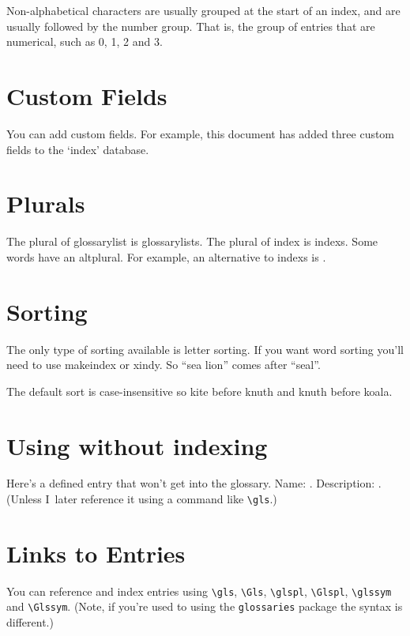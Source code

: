 \documentclass{book}
\newcommand*{\glsaltpl}[1]{\useentry{#1}{AltPlural}}
\begin{document}
Non-alphabetical characters are usually grouped at the start of an
index, and are usually followed by the number group. That is, the
group of entries that are numerical, such as \gls{0}, \gls{1},
\gls{2} and \gls{3}.

\section{Custom Fields}

You can add custom fields. For example, this document has added
three custom fields to the `index' database.

\section{Plurals}

The \gls{plural} of \gls{glossarylist} is
\glspl{glossarylist}. The \gls{plural} of \gls{index} is
\glspl{index}. Some words have an \gls{altplural}. For example,
an alternative to \glspl{index} is 
\glsaltpl{index}.%

\section{Sorting}

The only type of sorting available is letter sorting. If you want
word sorting you'll need to use \gls{makeindex} or \gls{xindy}.
So ``\gls{sea lion}'' comes after ``\gls{seal}''.

The default sort is case-insensitive so \gls{kite} before
\gls{knuth} and \gls{knuth} before \gls{koala}.

\section{Using without indexing}

Here's a defined entry that won't get into the glossary.
Name: .
Description: .
(Unless I~later reference it using a command like \verb|\gls|.)

\section{Links to Entries}

You can reference and index entries using \verb|\gls|, \verb|\Gls|,
\verb|\glspl|, \verb|\Glspl|, \verb|\glssym| and \verb|\Glssym|.
(Note, if you're used to using the \texttt{glossaries} package
the syntax is different.)
\end{document}
